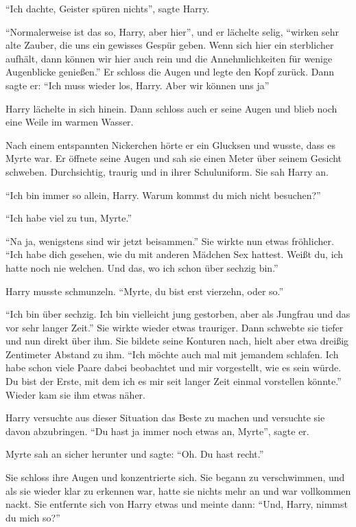 \enquote{Ich dachte, Geister spüren nichts}, sagte Harry.

\enquote{Normalerweise ist das so, Harry, aber hier}, und er lächelte selig, \enquote{wirken sehr alte Zauber, die uns ein gewisses Gespür geben. Wenn sich hier ein sterblicher aufhält, dann können wir hier auch rein und die Annehmlichkeiten für wenige Augenblicke genießen.} Er schloss die Augen und legte den Kopf zurück. Dann sagte er: \enquote{Ich muss wieder los, Harry. Aber wir können uns ja} 

Harry lächelte in sich hinein. Dann schloss auch er seine Augen und blieb noch eine Weile im warmen Wasser.

Nach einem entspannten Nickerchen hörte er ein Glucksen und wusste, dass es Myrte war. Er öffnete seine Augen und sah sie einen Meter über seinem Gesicht schweben. Durchsichtig, traurig und in ihrer Schuluniform. Sie sah Harry an.

\enquote{Ich bin immer so allein, Harry. Warum kommst du mich nicht besuchen?}

\enquote{Ich habe viel zu tun, Myrte.}

\enquote{Na ja, wenigstens sind wir jetzt beisammen.} Sie wirkte nun etwas fröhlicher. \enquote{Ich habe dich gesehen, wie du mit anderen Mädchen Sex hattest. \gst Weißt du, ich hatte noch nie welchen. Und das, wo ich schon über sechzig bin.}

Harry musste schmunzeln. \enquote{Myrte, du bist erst vierzehn, oder so.}

\enquote{Ich bin über sechzig. Ich bin vielleicht jung gestorben, aber als Jungfrau und das vor sehr langer Zeit.} Sie wirkte wieder etwas trauriger. Dann schwebte sie tiefer und nun direkt über ihm. Sie bildete seine Konturen nach, hielt aber etwa dreißig Zentimeter Abstand zu ihm. \enquote{Ich möchte auch mal mit jemandem schlafen. Ich habe schon viele Paare dabei beobachtet und mir vorgestellt, wie es sein würde. Du bist der Erste, mit dem ich es mir seit langer Zeit einmal vorstellen könnte.} Wieder kam sie ihm etwas näher.

Harry versuchte aus dieser Situation das Beste zu machen und versuchte sie davon abzubringen. \enquote{Du hast ja immer noch etwas an, Myrte}, sagte er.

Myrte sah an sicher herunter und sagte: \enquote{Oh. Du hast recht.}

Sie schloss ihre Augen und konzentrierte sich. Sie begann zu verschwimmen, und als sie wieder klar zu erkennen war, hatte sie nichts mehr an und war vollkommen nackt. Sie entfernte sich von Harry etwas und meinte dann: \enquote{Und, Harry, nimmst du mich so?}

